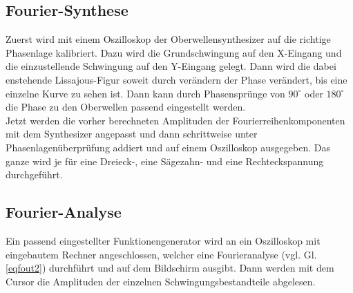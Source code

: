 %
%
\subsection{Fourier-Synthese}
Zuerst wird mit einem Oszilloskop der Oberwellensynthesizer auf die richtige 
Phasenlage kalibriert. Dazu wird die Grundschwingung auf den X-Eingang und die 
einzustellende Schwingung auf den Y-Eingang gelegt. Dann wird die dabei enstehende
Lissajous-Figur soweit durch verändern der Phase verändert, bis eine einzelne Kurve
zu sehen ist. Dann kann durch Phasensprünge von $90^{\circ}$ oder $180^{\circ}$ die Phase
zu den Oberwellen passend eingestellt werden.\\
Jetzt werden die vorher berechneten Amplituden der Fourierreihenkomponenten mit dem
Synthesizer angepasst und dann schrittweise unter Phasenlagenüberprüfung addiert und
auf einem Oszilloskop ausgegeben. Das ganze wird je für eine Dreieck-, eine Sägezahn- und
eine Rechteckspannung durchgeführt. 
\subsection{Fourier-Analyse}
Ein passend eingestellter Funktionengenerator wird an ein Oszilloskop mit eingebautem Rechner
angeschlossen, welcher eine Fourieranalyse (vgl. Gl. \ref{eqfout2}) durchführt und auf dem Bildschirm
ausgibt. Dann werden mit dem Cursor die Amplituden der einzelnen Schwingungsbestandteile abgelesen.